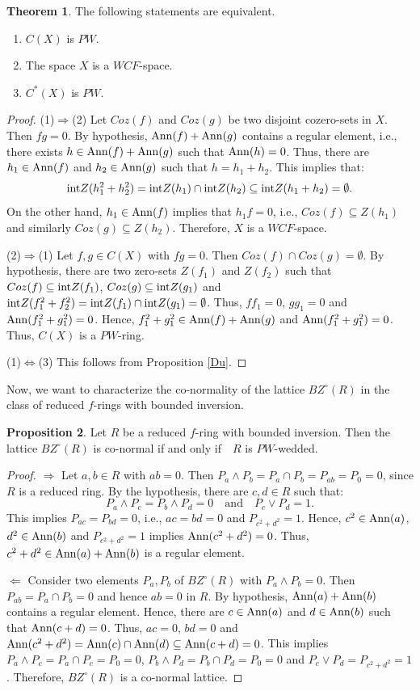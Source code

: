 \documentclass{amsart}
\theoremstyle{definition}
\theoremstyle{remark}
\numberwithin{equation}{section}
\newcommand{\Ann}{{\rm Ann}}
\newcommand{\rint}{{\rm int}}
\def\ifif {if and only if\ \ }
\theoremstyle{definition}\newtheorem{thm}{Theorem}[section]
\theoremstyle{definition}\newtheorem{cor}[thm]{Corollary}
\theoremstyle{definition}\newtheorem{lem}[thm]{Lemma}
\theoremstyle{definition}\newtheorem{prop}[thm]{Proposition}
\theoremstyle{definition}\newtheorem{defn}[thm]{Definition}
\theoremstyle{definition}\newtheorem{Rem}[thm]{Remark}
\theoremstyle{remark}\newtheorem{rem}[thm]{Remark}
\theoremstyle{definition}\newtheorem{exam}[thm]{Example}
\theoremstyle{definition}\newtheorem{qu}[thm]{question}
\begin{document}
\begin{thm}\label{sot} The following statements are equivalent. 
\begin{enumerate} 
\item $C(X)$ is $PW$. 
\item The space $X$ is a $WCF$-space. \item $C^*(X)$ is $PW$. 
\end{enumerate} 
\end{thm} \begin{proof} 
(1)$\Rightarrow$(2) Let $Coz(f)$ and $Coz(g)$ be two disjoint cozero-sets in $X$. Then $fg=0$. By hypothesis, $\Ann(f)+\Ann(g)$ contains a regular element, i.e., there exists $h\in \Ann(f)+\Ann(g)$ such that $\Ann(h)=0$. Thus, there are $h_1\in\Ann(f)$ and $h_2\in\Ann(g)$ such that $h=h_1+ h_2$. This implies that: \[\rint Z(h_1^2+ h_2^2)=\rint Z(h_1)\cap\rint Z(h_2)\subseteq\rint Z(h_1+ h_2)=\emptyset.\] On the other hand, $h_1\in \Ann(f)$ implies that $h_1f=0$, i.e., $Coz(f)\subseteq Z(h_1)$ and similarly $Coz(g)\subseteq Z(h_2)$. Therefore, $X$ is a $WCF$-space.

 (2)$\Rightarrow$(1) Let $f, g\in C(X)$ with $fg=0$. Then $Coz(f)\cap Coz(g)=\emptyset$. By hypothesis, there are two zero-sets $Z(f_1)$ and $Z(f_2)$ such that $Coz(f)\subseteq\rint Z(f_1)$, $Coz(g)\subseteq\rint Z(g_1)$ and $\rint Z(f_1^2+ f_2^2)=\rint Z(f_1)\cap\rint Z(g_1)=\emptyset$. Thus, $ff_1=0$, $gg_1=0$ and $\Ann(f_1^2+ g_1^2)=0$. Hence, $f_1^{2} +g_1^{2}\in \Ann(f)+\Ann(g)$ and $\Ann(f_1^2+ g_1^2)=0$. Thus, $C(X)$ is a $PW$-ring. 
 
 (1)$\Leftrightarrow$(3) This follows from Proposition \ref{Du}. 
\end{proof} 
Now, we want to characterize the co-normality of the lattice $BZ^{\circ}(R)$ in the class of reduced $f$-rings with bounded inversion. 
\begin{prop}\label{2} 
Let $R$ be a reduced $f$-ring with bounded inversion. Then the lattice $BZ^{\circ}(R)$ is co-normal \ifif $R$ is $PW$-wedded. 
\end{prop}
\begin{proof} $\Rightarrow$ Let $a, b\in R$ with $ab=0$. Then $P_a\wedge P_b=P_a\cap P_b=P_{ab}=P_{0}=0$, since $R$ is a reduced ring. By the hypothesis, there are $c, d\in R$ such that: \[P_a\wedge P_c=P_b\wedge P_d=0\quad\text{and}\quad P_c\vee P_d=1.\] This implies $P_{ac}=P_{bd}=0$, i.e., $ac=bd=0$ and $P_{c^2+ d^2}=1$. Hence, $c^2\in\Ann(a)$, $d^2\in\Ann(b)$ and $P_{c^2+ d^2}=1$ implies $\Ann(c^2+ d^2)=0$. Thus, $c^2+ d^2\in \Ann(a)+ \Ann(b)$ is a regular element. 

$\Leftarrow$ Consider two elements $P_a, P_b$ of $BZ^{\circ}(R)$ with $P_a\wedge P_b=0$. Then $P_{ab}=P_a\cap P_b=0$ and hence $ab=0$ in $R$. By hypothesis, $\Ann(a)+ \Ann(b)$ contains a regular element. Hence, there are $c\in\Ann(a)$ and $d\in\Ann(b)$ such that $\Ann(c+ d)=0$. Thus, $ac=0$, $bd=0$ and $\Ann(c^2+ d^2)=\Ann(c)\cap\Ann(d)\subseteq\Ann(c+ d)=0$. This implies $P_a\wedge P_c=P_a\cap P_c=P_0=0$, $P_b\wedge P_d=P_b\cap P_d=P_0=0$ and $P_c\vee P_d=P_{c^2+ d^2}=1$. Therefore, $BZ^{\circ}(R)$ is a co-normal lattice. \end{proof}
\end{document}
